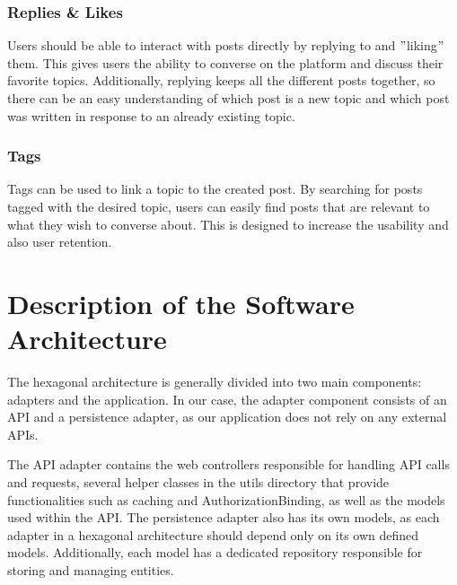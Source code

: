 \documentclass[a4paper, 11pt]{article}
\begin{document}
    \subsubsection{Replies \& Likes}
    Users should be able to interact with posts directly by replying to and \("\)liking\("\) them. This gives users the ability to converse on the platform and discuss their favorite topics. Additionally, replying keeps all the different posts together, so there can be an easy understanding of which post is a new topic and which post was written in response to an already existing topic.

    \subsubsection{Tags}
    Tags can be used to link a topic to the created post. By searching for posts tagged with the desired topic, users can easily find posts that are relevant to what they wish to converse about. This is designed to increase the usability and also user retention.




    \section{Description of the Software Architecture}\label{sec:description-of-the-software-architecture}
    The hexagonal architecture is generally divided into two main components: adapters and the application. In our case, the adapter component consists of an API and a persistence adapter, as our application does not rely on any external APIs.

    The API adapter contains the web controllers responsible for handling API calls and requests, several helper classes in the utils directory that provide functionalities such as caching and AuthorizationBinding, as well as the models used within the API. The persistence adapter also has its own models, as each adapter in a hexagonal architecture should depend only on its own defined models. Additionally, each model has a dedicated repository responsible for storing and managing entities.
\end{document}
